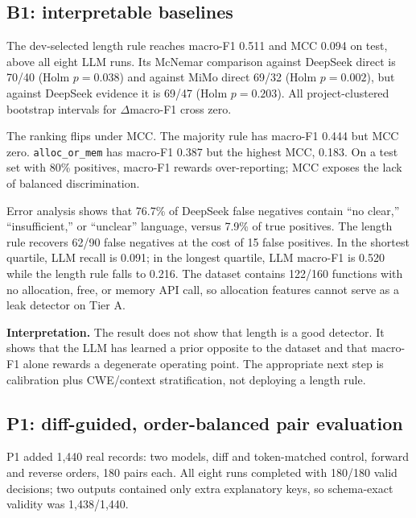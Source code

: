 \documentclass[conference]{IEEEtran}
\begin{document}
\subsection{B1: interpretable baselines}

The dev-selected length rule reaches macro-F1 0.511 and MCC 0.094 on test, above all eight LLM runs. Its McNemar comparison against DeepSeek direct is 70/40 (Holm $p=0.038$) and against MiMo direct 69/32 (Holm $p=0.002$), but against DeepSeek evidence it is 69/47 (Holm $p=0.203$). All project-clustered bootstrap intervals for $\Delta$macro-F1 cross zero.

The ranking flips under MCC. The majority rule has macro-F1 0.444 but MCC zero. \texttt{alloc\_or\_mem} has macro-F1 0.387 but the highest MCC, 0.183. On a test set with 80\% positives, macro-F1 rewards over-reporting; MCC exposes the lack of balanced discrimination.

Error analysis shows that 76.7\% of DeepSeek false negatives contain ``no clear,'' ``insufficient,'' or ``unclear'' language, versus 7.9\% of true positives. The length rule recovers 62/90 false negatives at the cost of 15 false positives. In the shortest quartile, LLM recall is 0.091; in the longest quartile, LLM macro-F1 is 0.520 while the length rule falls to 0.216. The dataset contains 122/160 functions with no allocation, free, or memory API call, so allocation features cannot serve as a leak detector on Tier A.

\textbf{Interpretation.} The result does not show that length is a good detector. It shows that the LLM has learned a prior opposite to the dataset and that macro-F1 alone rewards a degenerate operating point. The appropriate next step is calibration plus CWE/context stratification, not deploying a length rule.

\subsection{P1: diff-guided, order-balanced pair evaluation}

P1 added 1,440 real records: two models, diff and token-matched control, forward and reverse orders, 180 pairs each. All eight runs completed with 180/180 valid decisions; two outputs contained only extra explanatory keys, so schema-exact validity was 1,438/1,440.
\end{document}
